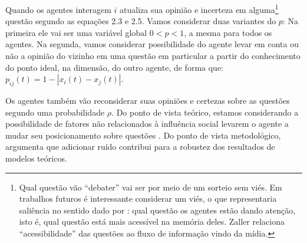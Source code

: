 Quando os agentes interagem \(i\) atualiza sua opinião e incerteza em
alguma\footnote{Qual questão vão ``debater'' vai ser por meio de um sorteio sem
  viés. Em trabalhos futuros é interessante considerar um viés, o que
  representaria saliência no sentido dado por :
  qual questão os agentes estão dando atenção, isto é, qual questão está mais
  acessível na memória deles. Zaller relaciona ``acessibilidade'' das questões
  ao fluxo de informação vindo da mídia.} questão segundo as equações 2.3 e 2.5.
Vamos considerar duas variantes do \(p\): Na primeira ele vai ser uma variável
global \(0 < p < 1 \), a mesma para todos os agentes. Na segunda, vamos considerar
possibilidade do agente levar em conta ou não a opinião do vizinho em uma
questão em particular a partir do conhecimento do ponto ideal, na dimensão, do
outro agente, de forma que: \(p_{ij}(t) = 1 - |x_i(t) - x_j(t)|\).

Os agentes também vão reconsiderar suas opiniões e certezas sobre as questões
segundo uma probabilidade \(\rho\). Do ponto de vista teórico, estamos considerando
a possibilidade de fatores não relacionados à influência social levarem o agente
a mudar seu posicionamento sobre questões \cite{flache2017, lorenz2017modeling}.
Do ponto de vista metodológico,  argumenta que
adicionar ruído contribui para a robustez dos resultados de modelos teóricos.












